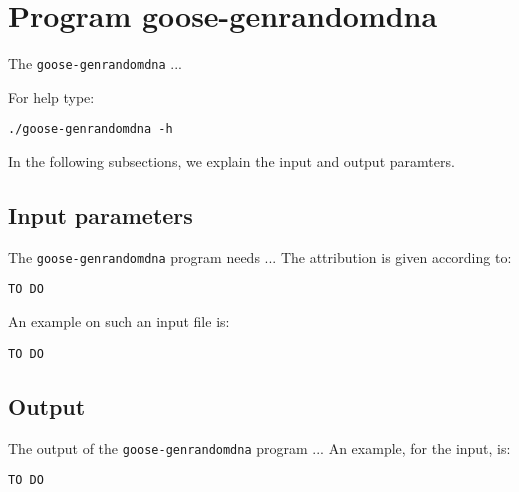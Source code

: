 \section{Program goose-genrandomdna}
The \texttt{goose-genrandomdna} ...

For help type:
\begin{lstlisting}
./goose-genrandomdna -h
\end{lstlisting}
In the following subsections, we explain the input and output paramters.

\subsection*{Input parameters}

The \texttt{goose-genrandomdna} program needs ...
The attribution is given according to:
\begin{lstlisting}
TO DO
\end{lstlisting}

An example on such an input file is:
\begin{lstlisting}
TO DO
\end{lstlisting}

\subsection*{Output}
The output of the \texttt{goose-genrandomdna} program ...
An example, for the input, is:
\begin{lstlisting}
TO DO
\end{lstlisting}
